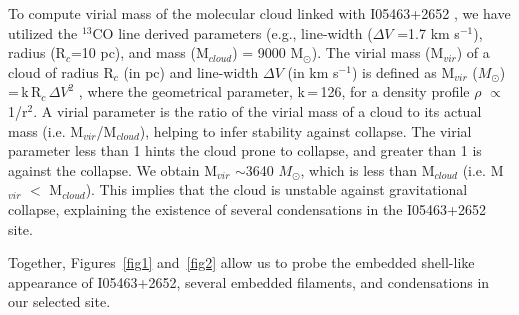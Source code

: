 \documentclass[iop]{emulateapj}
\begin{document}
To compute virial mass of the molecular cloud linked with I05463+2652 \citep[i.e., ``182.0$-$00.3";][]{kawamura98}, 
we have utilized the $^{13}$CO line derived parameters (e.g., line-width ($\Delta V$ =1.7 km s$^{-1}$), radius (R$_{c}$=10 pc), 
and mass (M$_{cloud}$) = 9000 M$_{\odot}$). 
The virial mass (M$_{vir}$) of a cloud of radius R$_{c}$ (in pc) and line-width $\Delta V$ (in km s$^{-1}$) is defined 
as M$_{vir}$ ($M_\odot$)\,=\,k\,R$_{c}$\,$\Delta V^2$ \citep{maclaren88}, 
where the geometrical parameter, k\,=\,126, for a density profile $\rho$ $\propto$ 1/r$^2$. 
A virial parameter is the ratio of the virial mass of a cloud to its actual mass (i.e. M$_{vir}$/M$_{cloud}$), 
helping to infer stability against collapse. The virial parameter less than 1 hints the cloud prone to collapse, and greater than 1 is against the collapse. 
We obtain M$_{vir}$ $\sim$3640 $M_\odot$, which is less than M$_{cloud}$ (i.e. M$_{vir}$ $<$ M$_{cloud}$). 
This implies that the cloud is unstable against gravitational collapse, explaining the existence of several condensations in the I05463+2652 site.

Together, Figures~\ref{fig1} and~\ref{fig2} allow us to probe the embedded shell-like appearance of I05463+2652, 
several embedded filaments, and condensations in our selected site. 
%
\end{document}
